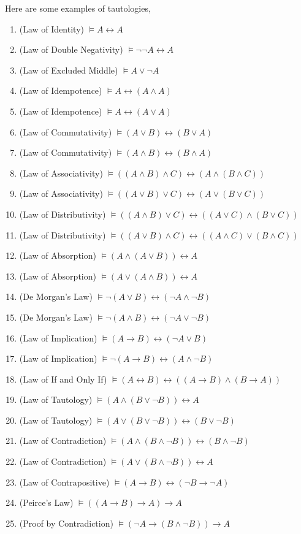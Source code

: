 \documentclass[11pt]{book}
\newcommand{\env}[2]{\begin{#1}#2\end{#1}}
\begin{document}
\begin{example}Here are some examples of tautologies,
\env{enumerate}{
	\item (Law of Identity) $\vDash A\leftrightarrow A$
	\item (Law of Double Negativity) $\vDash \lnot\lnot A\leftrightarrow A$
	\item (Law of Excluded Middle) $\vDash A\lor \lnot A$
	\item (Law of Idempotence) $\vDash A\leftrightarrow (A\land A)$
	\item (Law of Idempotence) $\vDash A\leftrightarrow (A\lor A)$
	\item (Law of Commutativity) $\vDash (A\lor B)\leftrightarrow (B\lor A)$
	\item (Law of Commutativity) $\vDash (A\land B)\leftrightarrow (B\land A)$
	\item (Law of Associativity) $\vDash ((A\land B)\land C)\leftrightarrow (A\land (B\land C))$
	\item (Law of Associativity) $\vDash ((A\lor B)\lor C)\leftrightarrow (A\lor (B\lor C))$
	\item (Law of Distributivity) $\vDash ((A\land B)\lor C)\leftrightarrow ((A\lor C)\land (B\lor C))$
	\item (Law of Distributivity) $\vDash ((A\lor B)\land C)\leftrightarrow ((A\land C)\lor (B\land C))$
	\item (Law of Absorption) $\vDash (A\land (A\lor B))\leftrightarrow A$
	\item (Law of Absorption) $\vDash (A\lor (A\land B))\leftrightarrow A$
	\item (De Morgan's Law) $\vDash \lnot(A\lor B)\leftrightarrow (\lnot A \land \lnot B)$
	\item (De Morgan's Law) $\vDash \lnot(A\land B)\leftrightarrow (\lnot A \lor \lnot B)$
	\item (Law of Implication) $\vDash (A\rightarrow B)\leftrightarrow (\neg A\lor B)$
	\item (Law of Implication) $\vDash \neg (A\rightarrow B)\leftrightarrow (A\land \neg B)$
	\item (Law of If and Only If) $\vDash (A\leftrightarrow B)\leftrightarrow ((A\rightarrow B)\land (B\rightarrow A))$
	\item (Law of Tautology) $\vDash (A\land (B\lor\neg B))\leftrightarrow A$
	\item (Law of Tautology) $\vDash (A\lor (B\lor\neg B))\leftrightarrow (B\lor\neg B)$
	\item (Law of Contradiction) $\vDash (A\land (B\land\neg B))\leftrightarrow (B\land\neg B)$
	\item (Law of Contradiction) $\vDash (A\lor (B\land\neg B))\leftrightarrow A$
	\item (Law of Contrapositive) $\vDash (A\rightarrow B)\leftrightarrow(\lnot B\rightarrow \lnot A)$
	\item (Peirce's Law) $\vDash ((A\rightarrow B)\rightarrow A)\rightarrow A$
	\item (Proof by Contradiction) $\vDash (\lnot A\rightarrow (B\land \lnot B))\rightarrow A$
	
}
\end{example}
\end{document}
